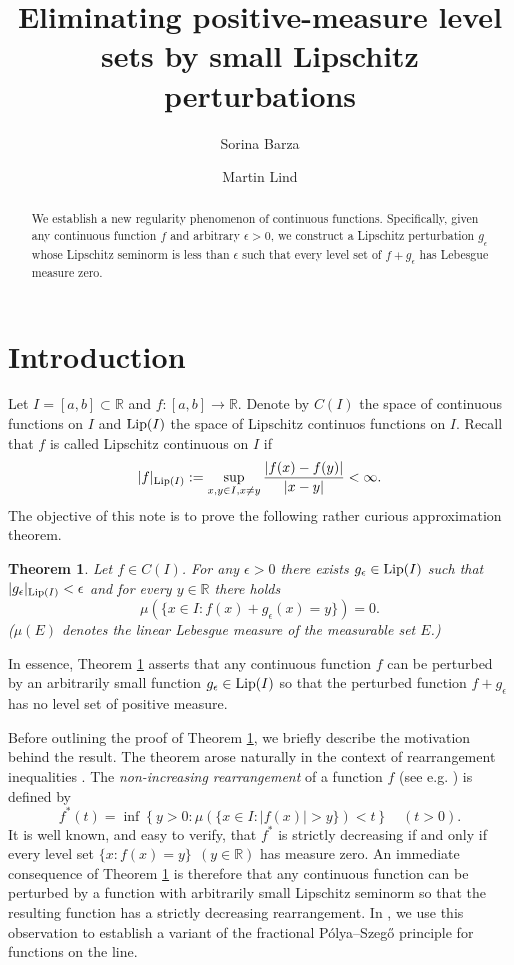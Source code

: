 \documentclass{amsart}
\title[Lipschitz perturbations]{Eliminating positive-measure level sets by small Lipschitz perturbations}
\author{Sorina Barza}
\author{Martin Lind}
\newtheorem{theorem}{Theorem}[section]
\numberwithin{equation}{section}
\begin{document}
\begin{abstract}
    We establish a new regularity phenomenon of continuous functions. Specifically, given any continuous function $f$ and arbitrary $\epsilon>0$, we construct a Lipschitz perturbation $g_\epsilon$ whose Lipschitz seminorm is less than $\epsilon$ such that every level set of $f+g_\epsilon$ has Lebesgue measure zero. 
\end{abstract}
\maketitle

\section{Introduction}

Let $I=[a,b]\subset\mathbb{R}$ and $f:[a,b]\rightarrow\mathbb{R}$. Denote by $C(I)$ the space of continuous functions on $I$ and ${\rm Lip}(I)$ the space of Lipschitz continuos functions on $I$. Recall that $f$ is called Lipschitz continuous on $I$ if  
\begin{equation}
    \nonumber
    |f|_{{\rm Lip}(I)}:=\sup_{x,y\in I, x\neq y}\frac{|f(x)-f(y)|}{|x-y|}<\infty.
\end{equation}
The objective of this note is to prove the following rather curious approximation theorem.
\begin{theorem}
    \label{LipschitzApprox}
    Let $f\in C(I)$. For any $\epsilon>0$ there exists $g_\epsilon\in{\rm Lip}(I)$ such that $|g_\epsilon|_{{\rm Lip}(I)}<\epsilon$ and for every $y\in\mathbb{R}$ there holds
    \begin{equation}
        \nonumber
        \mu(\{x\in I:f(x)+g_\epsilon(x)=y\})=0.
    \end{equation}
    ($\mu(E)$ denotes the linear Lebesgue measure of the measurable set $E$.)
\end{theorem}
In essence, Theorem \ref{LipschitzApprox} asserts that any continuous function $f$ can be perturbed by an arbitrarily small function $g_\epsilon\in{\rm Lip}(I)$ so that the perturbed function $f+g_\epsilon$ has no level set of positive measure.  


Before outlining the proof of Theorem \ref{LipschitzApprox}, we briefly describe the motivation behind the result. The theorem arose naturally in the context of rearrangement inequalities \cite{BaLi26a}. The \emph{non-increasing rearrangement} of a function $f$ (see e.g. \cite[Chapter 2]{BeSh88}) is defined by
\begin{equation}
    \nonumber
    f^*(t)=\inf\left\{y>0:\mu(\{x\in I:|f(x)|>y\})<t\right\}\quad(t>0).
\end{equation}
It is well known, and easy to verify, that
$f^*$ is strictly decreasing if and only if every level set $\{x:f(x)=y\}~~(y\in\mathbb{R})$ has measure zero. An immediate consequence of Theorem \ref{LipschitzApprox} is therefore that any continuous function can be perturbed by a function with arbitrarily small Lipschitz seminorm so that the resulting function has a strictly decreasing rearrangement. In \cite{BaLi26a}, we use this observation to establish a variant of the fractional P\'{o}lya--Szeg\H{o} principle for functions on the line.
\end{document}
